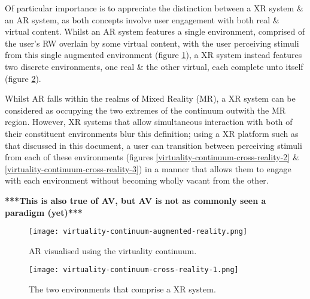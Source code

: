 
Of particular importance is to appreciate the distinction between a XR system \& an AR system, as both concepts involve user engagement with both real \& virtual content. Whilst an AR system features a single environment, comprised of the user's RW overlain by some virtual content, with the user perceiving stimuli from this single augmented environment (figure \ref{virtuality-continuum-augmented-reality}), a XR system instead features two discrete environments, one real \& the other virtual, each complete unto itself (figure \ref{virtuality-continuum-cross-reality-1}).

Whilst AR falls within the realms of Mixed Reality (MR), a XR system can be considered as occupying the two extremes of the continuum outwith the MR region. However, XR systems that allow simultaneous interaction with both of their constituent environments blur this definition; using a XR platform such as that discussed in this document, a user can transition between perceiving stimuli from each of these environments (figures \ref{virtuality-continuum-cross-reality-2} \& \ref{virtuality-continuum-cross-reality-3}) in a manner that allows them to engage with each environment without becoming wholly vacant from the other.

\textbf{***This is also true of AV, but AV is not as commonly seen a paradigm (yet)***}

\begin{figure}[h]
	\begin{center}
		\texttt{[image: virtuality-continuum-augmented-reality.png]}
		\caption{AR visualised using the virtuality continuum.}
		\label{virtuality-continuum-augmented-reality}
	\end{center}
\end{figure}

\begin{figure}[h]
	\begin{center}
		\texttt{[image: virtuality-continuum-cross-reality-1.png]}
		\caption{The two environments that comprise a XR system.}
		\label{virtuality-continuum-cross-reality-1}
	\end{center}
\end{figure}

